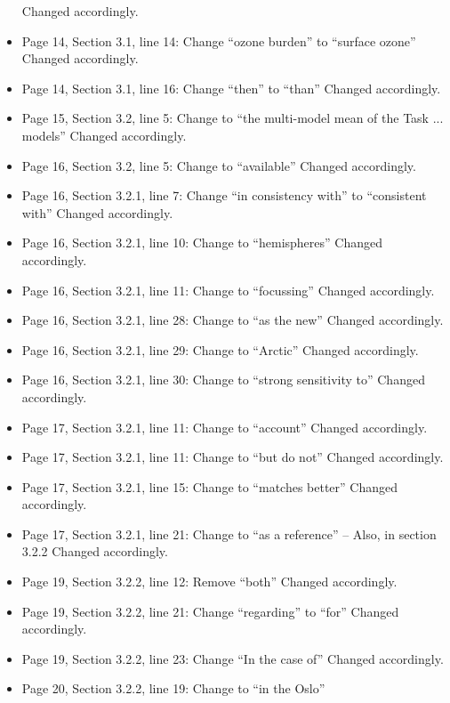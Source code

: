 \begin{itemize}
  Changed accordingly.
\item {\color{blue}Page 14, Section 3.1, line 14: Change “ozone burden” to “surface ozone”}
  Changed accordingly.
\item {\color{blue}Page 14, Section 3.1, line 16: Change “then” to “than”}
  Changed accordingly.
\item {\color{blue}Page 15, Section 3.2, line 5: Change to “the multi-model mean of the Task ... models”}
  Changed accordingly.
\item {\color{blue}Page 16, Section 3.2, line 5: Change to “available”}
  Changed accordingly.
\item {\color{blue}Page 16, Section 3.2.1, line 7: Change “in consistency with” to “consistent with”}
  Changed accordingly.
\item {\color{blue}Page 16, Section 3.2.1, line 10: Change to “hemispheres”}
  Changed accordingly.
\item {\color{blue}Page 16, Section 3.2.1, line 11: Change to “focussing”}
  Changed accordingly.
\item {\color{blue}Page 16, Section 3.2.1, line 28: Change to “as the new”}
  Changed accordingly.
\item {\color{blue}Page 16, Section 3.2.1, line 29: Change to “Arctic”}
  Changed accordingly.
\item {\color{blue}Page 16, Section 3.2.1, line 30: Change to “strong sensitivity to”}
  Changed accordingly.
\item {\color{blue}Page 17, Section 3.2.1, line 11: Change to “account”}
  Changed accordingly.
\item {\color{blue}Page 17, Section 3.2.1, line 11: Change to “but do not”}
  Changed accordingly.
\item {\color{blue}Page 17, Section 3.2.1, line 15: Change to “matches better”}
  Changed accordingly.
\item {\color{blue}Page 17, Section 3.2.1, line 21: Change to “as a reference” – Also, in section 3.2.2}
  Changed accordingly.
\item {\color{blue}Page 19, Section 3.2.2, line 12: Remove “both”}
  Changed accordingly.
\item {\color{blue}Page 19, Section 3.2.2, line 21: Change “regarding” to “for”}
  Changed accordingly.
\item {\color{blue}Page 19, Section 3.2.2, line 23: Change “In the case of”}
  Changed accordingly.
\item {\color{blue}Page 20, Section 3.2.2, line 19: Change to “in the Oslo”}

\end{itemize}
